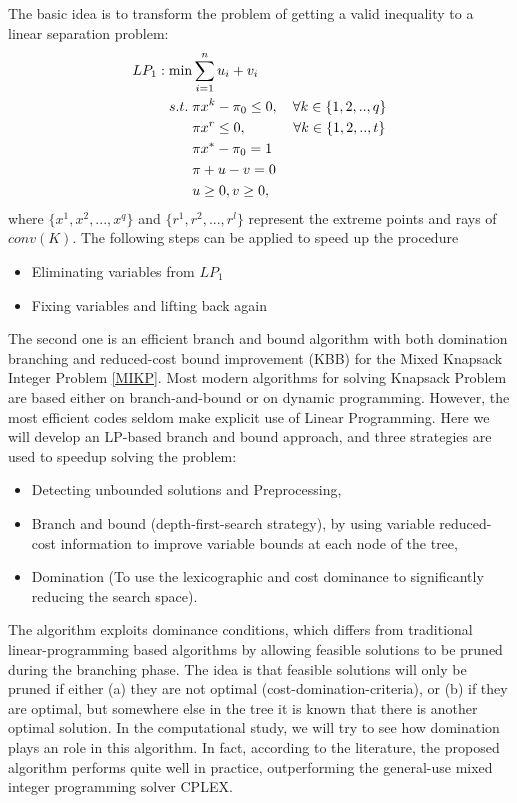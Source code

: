 \documentclass[a4paper,10pt]{article}
\begin{document}
The basic idea is to transform the problem of getting a valid inequality to a linear separation problem:
\begin{align}
LP_1: \min &\sum_{i=1}^{n} u_i+v_i \notag\\
s.t. \;  & \pi x^k-\pi_0\leq 0,  \quad \forall k\in\{1,2,..,q\} \notag\\
& \pi x^r\leq 0, \quad~ \qquad \forall  k\in\{1,2,..,t\} \notag\\
& \pi x^*-\pi_0 = 1 \notag\\
& \pi+u-v = 0 \notag\\
&u\geq 0, v\geq 0\notag,
\end{align}
where $\{x^1, x^2,...,x^q\}$ and $\{r^1,r^2,..., r^l\}$ represent the extreme points and rays of $conv(K)$. The following steps can be applied to speed up the procedure
\begin{itemize}
 \item Eliminating variables from $LP_1$
 \item Fixing variables and lifting back again
\end{itemize}

The second one is an efficient branch and bound algorithm with both domination branching and reduced-cost bound improvement (KBB) for the Mixed 
Knapsack Integer Problem \eqref{MIKP}. Most modern algorithms for solving Knapsack Problem are based either on branch-and-bound or on dynamic 
programming. However, the most efficient codes seldom make explicit use of Linear Programming. Here we will develop an LP-based branch and bound 
approach, and three strategies are used to speedup solving the problem:
\begin{itemize}
 \item Detecting unbounded solutions and Preprocessing,
 \item Branch and bound (depth-first-search strategy), by using variable reduced-cost information to improve variable bounds at each node of the tree,
 \item Domination (To use the lexicographic and cost dominance to significantly reducing the search space). 
\end{itemize}

The algorithm exploits dominance conditions, which differs from traditional linear-programming based algorithms by allowing feasible 
solutions to be pruned during the branching phase. The idea is that feasible solutions will only be pruned if either (a) they are not 
optimal (cost-domination-criteria), or (b) if they are optimal, but somewhere else in the tree it is known that there is another optimal 
solution. In the computational study, we will try to see how  domination plays an role in this algorithm. In fact, according to the literature, the 
proposed algorithm performs quite well in practice, outperforming the general-use mixed integer programming solver CPLEX. 
\end{document}
